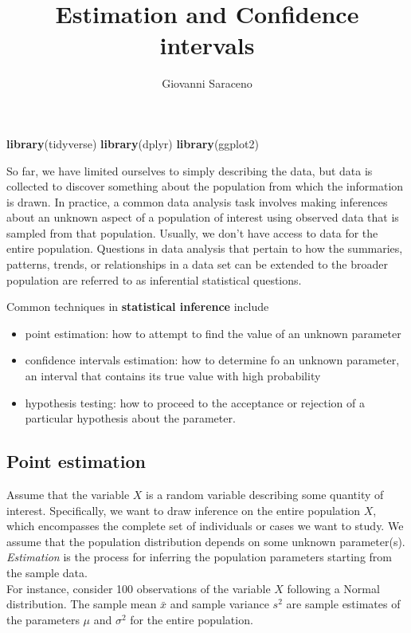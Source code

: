 \documentclass[
]{article}
\title{Estimation and Confidence intervals}
\author{Giovanni Saraceno}
\date{}
\newenvironment{Shaded}{\begin{snugshade}}{\end{snugshade}}
\newcommand{\FunctionTok}[1]{\textcolor[rgb]{0.13,0.29,0.53}{\textbf{#1}}}
\newcommand{\NormalTok}[1]{#1}
\providecommand{\tightlist}{%
  \setlength{\itemsep}{0pt}\setlength{\parskip}{0pt}}
\begin{document}
\maketitle

{
\setcounter{tocdepth}{2}
\tableofcontents
}
\begin{Shaded}
\begin{Highlighting}[]
\FunctionTok{library}\NormalTok{(tidyverse)}
\FunctionTok{library}\NormalTok{(dplyr)}
\FunctionTok{library}\NormalTok{(ggplot2)}
\end{Highlighting}
\end{Shaded}

So far, we have limited ourselves to simply describing the data, but
data is collected to discover something about the population from which
the information is drawn. In practice, a common data analysis task
involves making inferences about an unknown aspect of a population of
interest using observed data that is sampled from that population.
Usually, we don't have access to data for the entire population.
Questions in data analysis that pertain to how the summaries, patterns,
trends, or relationships in a data set can be extended to the broader
population are referred to as inferential statistical questions.

Common techniques in \textbf{statistical inference} include

\begin{itemize}
\tightlist
\item
  point estimation: how to attempt to find the value of an unknown
  parameter
\item
  confidence intervals estimation: how to determine fo an unknown
  parameter, an interval that contains its true value with high
  probability
\item
  hypothesis testing: how to proceed to the acceptance or rejection of a
  particular hypothesis about the parameter.
\end{itemize}

\hypertarget{point-estimation}{%
\subsection{Point estimation}\label{point-estimation}}

Assume that the variable \(X\) is a random variable describing some
quantity of interest. Specifically, we want to draw inference on the
entire population \(X\), which encompasses the complete set of
individuals or cases we want to study. We assume that the population
distribution depends on some unknown parameter(s). \emph{Estimation} is
the process for inferring the population parameters starting from the
sample data.\\
For instance, consider 100 observations of the variable \(X\) following
a Normal distribution. The sample mean \(\bar{x}\) and sample variance
\(s^2\) are sample estimates of the parameters \(\mu\) and \(\sigma^2\)
for the entire population.
\end{document}
